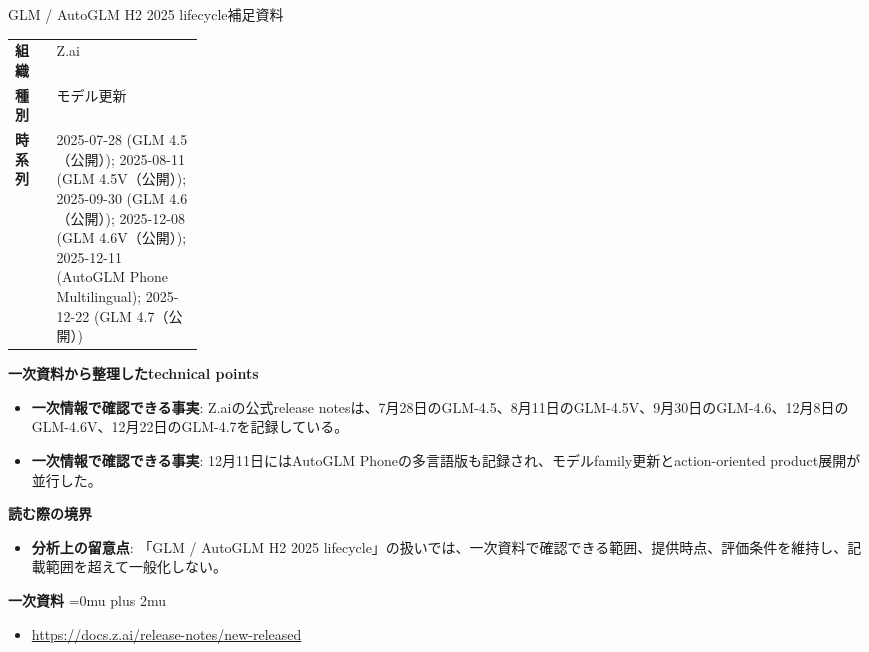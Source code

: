 \begin{technicalnote}{GLM / AutoGLM H2 2025 lifecycle}{補足資料}
\begingroup
\begin{tabularx}{\linewidth}{@{}>{\bfseries}p{0.22\linewidth}X@{}}
組織 & Z.ai \\
種別 & モデル更新 \\
時系列 & 2025-07-28 (GLM 4.5（公開）); 2025-08-11 (GLM 4.5V（公開）); 2025-09-30 (GLM 4.6（公開）); 2025-12-08 (GLM 4.6V（公開）); 2025-12-11 (AutoGLM Phone Multilingual); 2025-12-22 (GLM 4.7（公開）) \\
\end{tabularx}
\smallskip
{\bfseries 一次資料から整理したtechnical points}
\begin{itemize}[leftmargin=1.5em,itemsep=0.35em]
\item \textbf{一次情報で確認できる事実}: Z.aiの公式release notesは、7月28日のGLM-4.5、8月11日のGLM-4.5V、9月30日のGLM-4.6、12月8日のGLM-4.6V、12月22日のGLM-4.7を記録している。
\item \textbf{一次情報で確認できる事実}: 12月11日にはAutoGLM Phoneの多言語版も記録され、モデルfamily更新とaction-oriented product展開が並行した。
\end{itemize}
\begin{minipage}{\linewidth}
{\bfseries 読む際の境界}
\begin{itemize}[leftmargin=1.5em,itemsep=0.35em]
\item \textbf{分析上の留意点}: 「GLM / AutoGLM H2 2025 lifecycle」の扱いでは、一次資料で確認できる範囲、提供時点、評価条件を維持し、記載範囲を超えて一般化しない。
\end{itemize}
\begin{samepage}
{\bfseries 一次資料}
\begingroup\sloppy
\Urlmuskip=0mu plus 2mu\relax
\begin{itemize}[leftmargin=1.5em,itemsep=0.25em]
\item {\scriptsize\url{https://docs.z.ai/release-notes/new-released}}
\end{itemize}
\endgroup
\end{samepage}
\end{minipage}
\endgroup
\end{technicalnote}
\medskip
